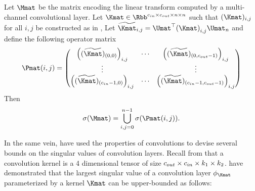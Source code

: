 \begin{theorem}
  Let $\Mmat$ be the matrix encoding the linear transform computed by a multi-channel convolutional layer.
  Let $\Kmat \in \Rbb^{\cin \times \cout \times n \times n}$ such that $(\Kmat)_{i,j}$ for all $i,j$ be constructed as in , 
  Let $\widetilde{\Kmat}_{i,j} = \Umat^\top \leftmat \Kmat \rightmat_{i,j} \Umat_n $ and define the following operator matrix 
  \begin{equation}
    \Pmat(i,j) = \leftmatrix 
    \leftmat (\widetilde{\Kmat})_{(0,0)} \rightmat_{i, j} & \cdots & \leftmat (\widetilde{\Kmat})_{(0, \cout-1)} \rightmat_{i, j} \\
    \vdots & & \vdots \\
    \leftmat (\widetilde{\Kmat})_{(\cin-1, 0)} \rightmat_{i, j} & \cdots & \leftmat (\widetilde{\Kmat})_{(\cin-1, \cout-1)} \rightmat_{i, j}
    \rightmatrix
  \end{equation}
  Then
  \begin{equation}
    \sigma(\Mmat) = \bigcup_{i, j = 0}^{n-1} \sigma \left(  \Pmat(i,j) \right).
  \end{equation}
  \removespace
\end{theorem}





In the same vein, \citet{singla2019bounding} have used the properties of convolutions to devise several bounds on the singular values of convolution layers.
Recall from  that a convolution kernel is a 4 dimensional tensor of size $c_{out} \times c_{in} \times k_1 \times k_2$.
\citet{singla2019bounding} have demonstrated that the largest singular value of a convolution layer $\layer_\Kmat$ parameterized by a kernel $\Kmat$ can be upper-bounded as follows:

